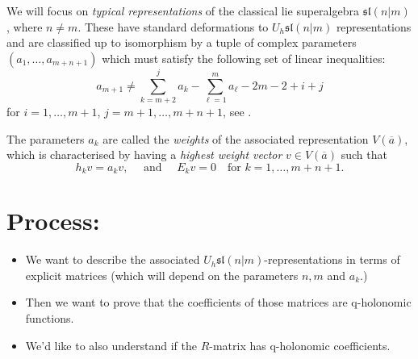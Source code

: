 \documentclass[a4paper]{article}
\begin{document}
We will focus on \emph{typical representations} of the classical lie superalgebra $\mathfrak{sl}(n|m)$, where $n \neq m$.
These have standard deformations to $U_h\mathfrak{sl}(n|m)$ representations and are classified up to isomorphism by a tuple of complex parameters $(a_1,\ldots,a_{m+n+1})$ which must satisfy the following set of linear inequalities:
\begin{equation}
  a_{m+1} \neq \sum_{k=m+2}^j a_k - \sum_{\ell = 1}^m a_\ell -2m - 2 + i + j
\end{equation}
for $i = 1,\ldots,m+1$, $j = m+1,\ldots, m+n+1$, see \cite[Example 1, pg 620]{Kac_1978}.

The parameters $a_k$ are called the \emph{weights} of the associated representation $V(\overline{a})$, which is characterised by having a \emph{highest weight vector} $v \in V(\overline{a})$ such that
\begin{equation}
    h_k v = a_k v, \quad\text{ and }\quad E_k v = 0  \quad\text{for } k = 1,\ldots,m+n+1.
\end{equation}

\section*{Process:}
\begin{itemize}
  \item We want to describe the associated $U_h\mathfrak{sl}(n|m)$-representations in terms of explicit matrices (which will depend on the parameters $n,m$ and $a_k$.)
  \item Then we want to prove that the coefficients of those matrices are q-holonomic functions.
  \item We'd like to also understand if the $R$-matrix has q-holonomic coefficients.
\end{itemize}




\end{document}
